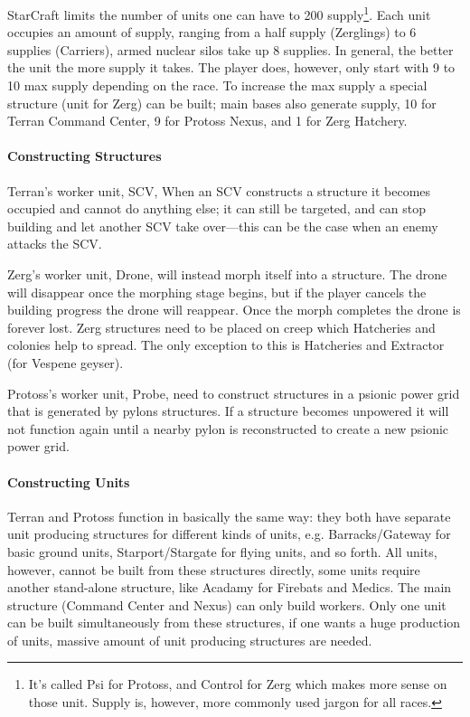 StarCraft limits the number of units one can have to 200 supply\footnote{It’s called Psi for Protoss, and Control for Zerg which makes more sense on those unit. Supply is, however, more commonly used jargon for all races.}. Each unit occupies an amount of supply, ranging from a half supply (Zerglings) to 6 supplies (Carriers), armed nuclear silos take up 8 supplies. In general, the better the unit the more supply it takes. The player does, however, only start with 9 to 10 max supply depending on the race. To increase the max supply a special structure (unit for Zerg) can be built; main bases also generate supply, 10 for Terran Command Center, 9 for Protoss Nexus, and 1 for Zerg Hatchery.

\paragraph{Constructing Structures}
Terran's worker unit, SCV,  When an SCV constructs a structure it becomes occupied and cannot do anything else; it can still be targeted, and can stop building and let another SCV take over—this can be the case when an enemy attacks the SCV.

Zerg’s worker unit, Drone, will instead morph itself into a structure. The drone will disappear once the morphing stage begins, but if the player cancels the building progress the drone will reappear. Once the morph completes the drone is forever lost. Zerg structures need to be placed on creep which Hatcheries and colonies help to spread. The only exception to this is Hatcheries and Extractor (for Vespene geyser).

Protoss’s worker unit, Probe, need to construct structures in a psionic power grid that is generated by pylons structures. If a structure becomes unpowered it will not function again until a nearby pylon is reconstructed to create a new psionic power grid.

\paragraph{Constructing Units}
Terran and Protoss function in basically the same way: they both have separate unit producing structures for different kinds of units, e.g. Barracks/Gateway for basic ground units, Starport/Stargate for flying units, and so forth. All units, however, cannot be built from these structures directly, some units require another stand-alone structure, like Acadamy for Firebats and Medics. The main structure (Command Center and Nexus) can only build workers. Only one unit can be built simultaneously from these structures, if one wants a huge production of units, massive amount of unit producing structures are needed.

